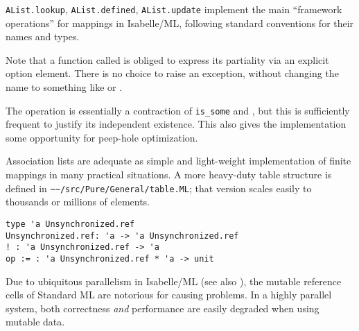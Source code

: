 \begin{isabellebody}
\begin{isamarkuptext}
\begin{description}
  \item \verb|AList.lookup|, \verb|AList.defined|, \verb|AList.update|
  implement the main ``framework operations'' for mappings in
  Isabelle/ML, following standard conventions for their names and
  types.

  Note that a function called  is obliged to express its
  partiality via an explicit option element.  There is no choice to
  raise an exception, without changing the name to something like
   or .

  The  operation is essentially a contraction of \verb|is_some| and , but this is sufficiently frequent to
  justify its independent existence.  This also gives the
  implementation some opportunity for peep-hole optimization.

  \end{description}

  Association lists are adequate as simple and light-weight
  implementation of finite mappings in many practical situations.  A
  more heavy-duty table structure is defined in \verb|~~/src/Pure/General/table.ML|; that version scales easily to
  thousands or millions of elements.%
\end{isamarkuptext}%
\isamarkuptrue%
%
\isamarkuptrue%
%
\isadelimmlref
%
\endisadelimmlref
%
\isatagmlref
%
\begin{isamarkuptext}%
\begin{mldecls}
  \verb|type 'a Unsynchronized.ref| \\
  \verb|Unsynchronized.ref: 'a -> 'a Unsynchronized.ref| \\
  \verb|! : 'a Unsynchronized.ref -> 'a| \\
  \verb|op := : 'a Unsynchronized.ref * 'a -> unit| \\
  \end{mldecls}%
\end{isamarkuptext}%
\isamarkuptrue%
%
\endisatagmlref
{\isafoldmlref}%
%
\isadelimmlref
%
\endisadelimmlref
%
\begin{isamarkuptext}%
Due to ubiquitous parallelism in Isabelle/ML (see also
  ), the mutable reference cells of
  Standard ML are notorious for causing problems.  In a highly
  parallel system, both correctness \emph{and} performance are easily
  degraded when using mutable data.


\end{isamarkuptext}
\end{isabellebody}
